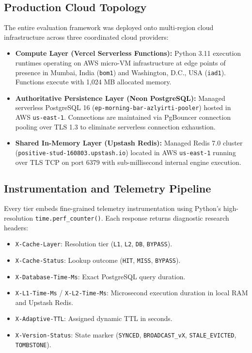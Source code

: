 \documentclass[conference]{IEEEtran}
\begin{document}
\subsection{Production Cloud Topology}
The entire evaluation framework was deployed onto multi-region cloud infrastructure across three coordinated cloud providers:
\begin{itemize}
    \item \textbf{Compute Layer (Vercel Serverless Functions):} Python 3.11 execution runtimes operating on AWS micro-VM infrastructure at edge points of presence in Mumbai, India (\texttt{bom1}) and Washington, D.C., USA (\texttt{iad1}). Functions execute with 1,024 MB allocated memory.
    \item \textbf{Authoritative Persistence Layer (Neon PostgreSQL):} Managed serverless PostgreSQL 16 (\texttt{ep-morning-bar-azlyirti-pooler}) hosted in AWS \texttt{us-east-1}. Connections are maintained via PgBouncer connection pooling over TLS 1.3 to eliminate serverless connection exhaustion.
    \item \textbf{Shared In-Memory Layer (Upstash Redis):} Managed Redis 7.0 cluster (\texttt{positive-stud-160803.upstash.io}) located in AWS \texttt{us-east-1} running over TLS TCP on port 6379 with sub-millisecond internal engine execution.
\end{itemize}

\subsection{Instrumentation and Telemetry Pipeline}
Every tier embeds fine-grained telemetry instrumentation using Python's high-resolution \texttt{time.perf_counter()}. Each response returns diagnostic research headers:
\begin{itemize}
    \item \texttt{X-Cache-Layer}: Resolution tier (\texttt{L1}, \texttt{L2}, \texttt{DB}, \texttt{BYPASS}).
    \item \texttt{X-Cache-Status}: Lookup outcome (\texttt{HIT}, \texttt{MISS}, \texttt{BYPASS}).
    \item \texttt{X-Database-Time-Ms}: Exact PostgreSQL query duration.
    \item \texttt{X-L1-Time-Ms} / \texttt{X-L2-Time-Ms}: Microsecond execution duration in local RAM and Upstash Redis.
    \item \texttt{X-Adaptive-TTL}: Assigned dynamic TTL in seconds.
    \item \texttt{X-Version-Status}: State marker (\texttt{SYNCED}, \texttt{BROADCAST\_vX}, \texttt{STALE\_EVICTED}, \texttt{TOMBSTONE}).
\end{itemize}
\end{document}
